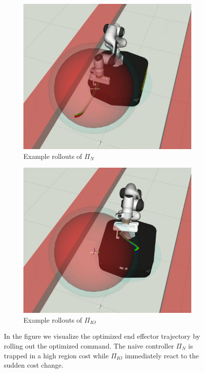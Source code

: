 \begin{figure}[t]
\centering
\begin{subfigure}{0.48\columnwidth}
    \includegraphics[width=\linewidth]{figures/obstacle_avoidance/rollouts_no_filter.pdf}
    \caption{Example rollouts of $\Pi_{N}$}
\end{subfigure}%
\hfill
\begin{subfigure}{0.48\columnwidth}
    \includegraphics[width=\linewidth]{figures/obstacle_avoidance/rollouts_filter.pdf}
    \caption{Example rollouts of $\Pi_{IO}$}
\end{subfigure}%
\hfill
\caption{In the figure we visualize the optimized end effector trajectory by rolling out the optimized command. The naive controller $\Pi_{N}$ is trapped in a high region cost while $\Pi_{IO}$ immediately react to the sudden cost change.}\label{fig:rollouts_comparison}
\end{figure}

